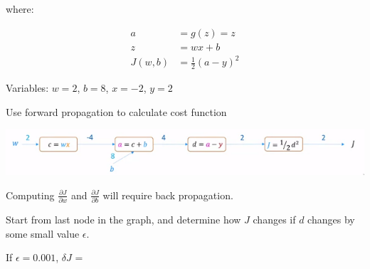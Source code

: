 \documentclass[12pt]{article}
\begin{document}
where:

\begin{align*}
a &= g(z) = z\\
z &= wx + b\\
J(w,b) &= \frac{1}{2} (a-y)^2
\end{align*}

Variables: $w = 2$, $b = 8$, $x = -2$, $y = 2$

\pagebreak

Use forward propagation to calculate cost function

\includegraphics[scale=.8]{nn/compgraph-ex/compgraph}

Computing $\frac{\partial J}{\partial w}$ and $\frac{\partial J}{\partial b}$ will require back propagation.

Start from last node in the graph, and determine how $J$ changes if $d$ changes by some small value $\epsilon$.

If $\epsilon = 0.001$, $\delta J$ = 
\end{document}
